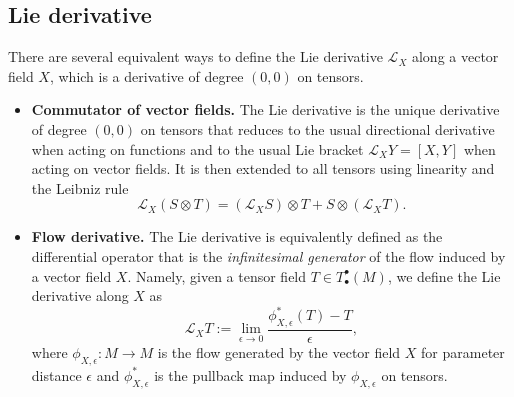 \documentclass[../geometry_main.tex]{subfiles}
\begin{document}
\subsection{Lie derivative}
\label{sec:lie_derivative}


\begin{mytheorem}
%
There are several equivalent ways to define the Lie derivative $\mathcal{L}_X$ along a vector field $X$, which is a derivative of degree $(0,0)$ on tensors.
\begin{itemize}
    \item[]\textbf{Commutator of vector fields.} The Lie derivative is the unique derivative of degree $(0,0)$ on tensors that reduces to the usual directional derivative when acting on functions and to the usual Lie bracket $\mathcal{L}_X Y = [X,Y]$ when acting on vector fields.
    It is then extended to all tensors using linearity and the Leibniz rule
    \begin{equation}
        \mathcal{L}_X (S \otimes T) = (\mathcal{L}_X S) \otimes T + S \otimes (\mathcal{L}_X T).
    \end{equation}

    \item[]\textbf{Flow derivative.} The Lie derivative is equivalently defined as the differential operator that is the \emph{infinitesimal generator} of the flow induced by a vector field \(X\).
    Namely, given a tensor field \(T\in T^{\bullet}_{\bullet} (M)\), we define the Lie derivative along \(X\) as
    \begin{equation}
        \mathcal{L}_X T := \lim_{\epsilon \to 0} \frac{\phi_{X,\epsilon}^* (T) - T}{ \epsilon},
    \end{equation}
    where \(\phi_{X,\epsilon}: M \to M\) is the flow generated by the vector field \(X\) for parameter distance \(\epsilon\) and \(\phi_{X,\epsilon}^*\) is the pullback map induced by \(\phi_{X,\epsilon}\) on tensors.


\end{itemize}
\end{mytheorem}
\end{document}
